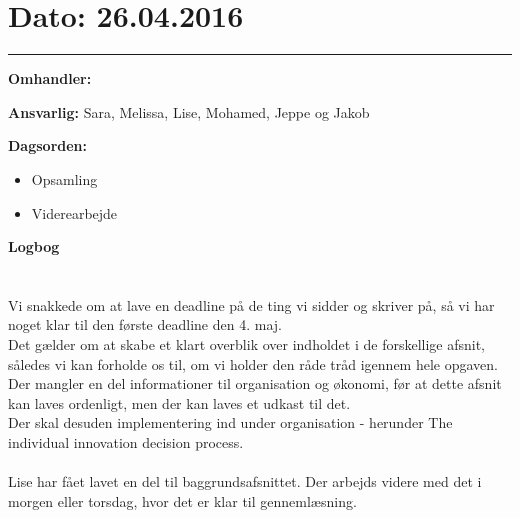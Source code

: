 \section{Dato: 26.04.2016}
\hrule

\textbf{Omhandler:}

\textbf{Ansvarlig:} Sara, Melissa, Lise, Mohamed, Jeppe og Jakob

\textbf{Dagsorden:}
\begin{itemize}
	\item Opsamling
	\item Viderearbejde
\end{itemize}

\textbf{Logbog}
\\
\\ \\
Vi snakkede om at lave en deadline på de ting vi sidder og skriver på, så vi har noget klar til den første deadline den 4. maj.\\
Det gælder om at skabe et klart overblik over indholdet i de forskellige afsnit, således vi kan forholde os til, om vi holder den råde tråd igennem hele opgaven.\\
Der mangler en del informationer til organisation og økonomi, før at dette afsnit kan laves ordenligt, men der kan laves et udkast til det.\\
Der skal desuden implementering ind under organisation - herunder The individual innovation decision process.\\ \\

Lise har fået lavet en del til baggrundsafsnittet. Der arbejds videre med det i morgen eller torsdag, hvor det er klar til gennemlæsning. 

